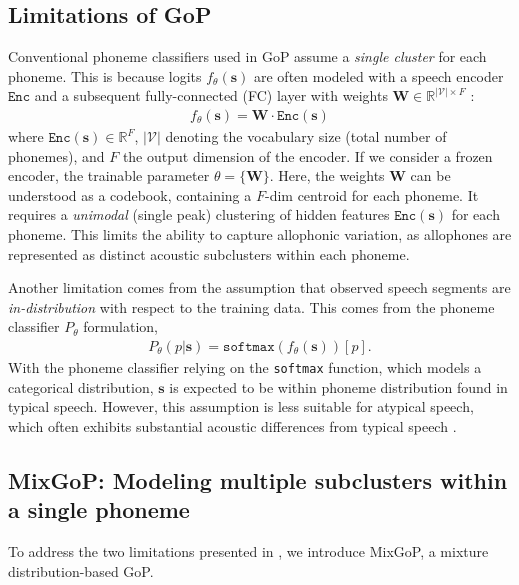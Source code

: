\subsection{Limitations of GoP}\label{sssec:limit_gop} 
Conventional phoneme classifiers used in GoP assume a \textit{single cluster} for each phoneme.
This is because logits $f_\theta(\mathbf{s})$ are often modeled with a speech encoder $\texttt{Enc}$ and a subsequent fully-connected (FC) layer with weights $\mathbf{W} \in \mathbb{R}^{|\mathcal{V}| \times F}$ \citep{xu21k_interspeech, yeo23_interspeech}:
\begin{align}
    f_\theta(\mathbf{s}) = \mathbf{W} \cdot \texttt{Enc}(\mathbf{s}) \label{eq:fc}
\end{align}
where $\texttt{Enc}(\mathbf{s}) \in \mathbb{R}^{F}$, $|\mathcal{V}|$ denoting the vocabulary size (total number of phonemes), and $F$ the output dimension of the encoder.
If we consider a frozen encoder, the trainable parameter $\theta = \{\mathbf{W}\}$.
Here, the weights $\mathbf{W}$ can be understood as a codebook, containing a $F$-dim centroid for each phoneme.
It requires a \textit{unimodal} (single peak) clustering of hidden features $\texttt{Enc}(\mathbf{s})$ for each phoneme.
This limits the ability to capture allophonic variation, as allophones are represented as distinct acoustic subclusters within each phoneme.


Another limitation comes from the assumption that observed speech segments are \textit{in-distribution} with respect to the training data. 
This comes from the phoneme classifier $P_\theta$ formulation,
\begin{align}
    P_\theta(p|\mathbf{s}) = \texttt{softmax}(f_\theta(\mathbf{s}))[p]. \label{eq:softmax}
\end{align}
With the phoneme classifier relying on the \texttt{softmax} function, which models a categorical distribution, $\mathbf{s}$ is expected to be within phoneme distribution found in typical speech.
However, this assumption is less suitable for atypical speech, which often exhibits substantial acoustic differences from typical speech \citep{yeo23_interspeech,korzekwa2021mispronunciation}.


\subsection{MixGoP: Modeling multiple subclusters within a single phoneme}\label{sssec:MixGoP}
To address the two limitations presented in , we introduce MixGoP, a mixture distribution-based GoP.

